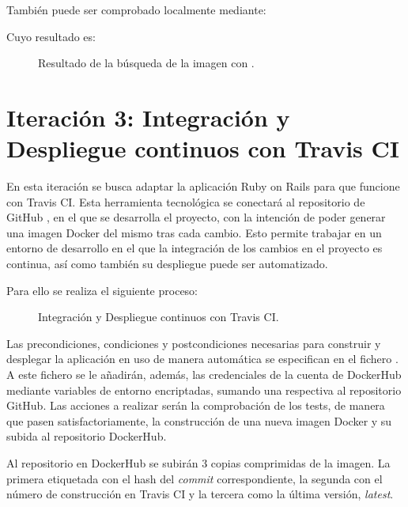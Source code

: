 También puede ser comprobado localmente mediante:


Cuyo resultado es:

\begin{figure}[H]
\caption{Resultado de la búsqueda de la imagen con .\label{fig:figure_placement_example}}
\end{figure}

\section{Iteración 3: Integración y Despliegue continuos con Travis CI}

En esta iteración se busca adaptar la aplicación Ruby on Rails para que funcione con Travis CI. Esta herramienta tecnológica se conectará al repositorio de GitHub , en el que se desarrolla el proyecto, con la intención de poder generar una imagen Docker del mismo tras cada cambio. Esto permite trabajar en un entorno de desarrollo en el que la integración de los cambios en el proyecto es continua, así como también su despliegue puede ser automatizado.

Para ello se realiza el siguiente proceso:
\begin{figure}[H]
\caption{Integración y Despliegue continuos con Travis CI.\label{fig:figure_placement_example}}
\end{figure}

Las precondiciones, condiciones y postcondiciones necesarias para construir y desplegar la aplicación en uso de manera automática se especifican en el fichero . A este fichero se le añadirán, además, las credenciales de la cuenta de DockerHub mediante variables de entorno encriptadas, sumando una respectiva al repositorio GitHub. Las acciones a realizar serán la comprobación de los tests, de manera que pasen satisfactoriamente, la construcción de una nueva imagen Docker y su subida al repositorio DockerHub.

Al repositorio en DockerHub se subirán 3 copias comprimidas de la imagen. La primera etiquetada con el hash del \textit{commit} correspondiente, la segunda con el número de construcción en Travis CI y la tercera como la última versión, \textit{latest}.

